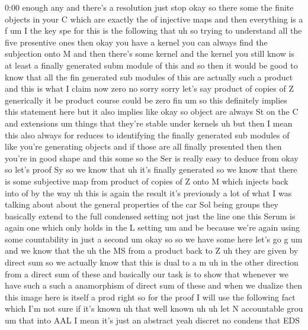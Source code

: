 \begin{unfinished}{0:00}
enough
any
and  there's  a
resolution  just
stop
okay  so  there
some  the  finite  objects  in  your  C  which
are  exactly  the  of  injective  maps
and  then  everything  is  a
f
um  I  the  key  spe  for
this  is  the  following  that  uh  so  trying
to  understand  all  the  five  presentive
ones  then  okay  you  have  a  kernel  you  can
always  find  the  subjection  onto  M  and
then  there's  some  kernel  and  the  kernel
you  still  know  is  at  least  a  finally
generated  subm  module  of  this  and  so
then  it  would  be  good  to  know  that  all
the  fin  generated  sub  modules  of  this
are  actually  such  a  product  and  this  is
what  I  claim
now
zero  no  sorry
sorry  let's  say  product  of  copies  of
Z  generically  it  be  product  course  could
be  zero
fin
um  so  this  definitely  implies  this
statement  here  but  it  also  implies  like
okay  so  object  are  always  St  on  the  C
and  extensions  um  things  that  they're
stable  under
kernels
uh  but  then  I  mean  this  also  always  for
reduces  to  identifying  the  finally
generated  sub  modules  of  like  you're
generating  objects  and  if  those  are  all
finally  presented  then  then  you're  in
good  shape  and  this
some
so  the  Ser  is  really  easy  to  deduce
from  okay  so  let's  proof
Sy
so  we  know  that  uh  it's  finally
generated  so  we  know  that  there  is  some
subjective  map  from  product  of  copies  of
Z  onto  M  which  injects  back  into
of  by  the  way  uh  this  is  again  the
result
it's  previously  a  lot  of  what  I  was
talking  about  about  the  general
properties  of  the  car  Sol  being  groups
they  basically  extend  to  the  full
condensed  setting  not  just  the  line  one
this  Serum  is  again  one  which  only  holds
in  the  L
setting
um  and  be  because  we're  again  using  some
countability  in  just  a  second  um  okay  so
so  we  have  some  here  let's  go  g
um  and  we  know  that  the
uh  the  MS  from  a  product  back  to  Z  uh
they  are  given  by  direct  sum  so  we
actually  know  that  this  is  dual  to  a
m
uh  in  the  other  direction  from  a  direct
sum  of
these  and  basically  our  task  is  to  show
that  whenever  we  have  such  a  such  a
anamorphism  of  direct  sum  of  these  and
when  we  dualize  then  this  image  here  is
itself  a  prod
right
so  for  the  proof  I  will  use  the
following  fact  which  I'm  not  sure  if
it's
known  uh  that  well  known
uh  uh
let  N  accountable  grou
um  that  into
AAL  I  mean  it's  just  an  abstract  yeah
discret  no  condens  that  EDS

\end{unfinished}
